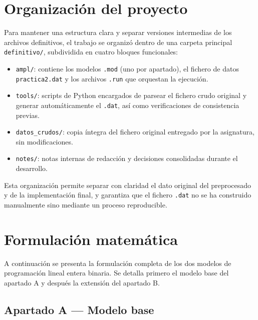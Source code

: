 \documentclass[12pt,a4paper]{article}
\begin{document}
\section{Organización del proyecto}

Para mantener una estructura clara y separar versiones intermedias de los archivos definitivos, el trabajo se organizó dentro de una carpeta principal \texttt{definitivo/}, subdividida en cuatro bloques funcionales:

\begin{itemize}
    \item \texttt{ampl/}: contiene los modelos \texttt{.mod} (uno por apartado), el fichero de datos \texttt{practica2.dat} y los archivos \texttt{.run} que orquestan la ejecución.
    \item \texttt{tools/}: scripts de Python encargados de parsear el fichero crudo original y generar automáticamente el \texttt{.dat}, así como verificaciones de consistencia previas.
    \item \texttt{datos\_crudos/}: copia íntegra del fichero original entregado por la asignatura, sin modificaciones.
    \item \texttt{notes/}: notas internas de redacción y decisiones consolidadas durante el desarrollo.
\end{itemize}

Esta organización permite separar con claridad el dato original del preprocesado y de la implementación final, y garantiza que el fichero \texttt{.dat} no se ha construido manualmente sino mediante un proceso reproducible.

\section{Formulación matemática}

A continuación se presenta la formulación completa de los dos modelos de programación lineal entera binaria. Se detalla primero el modelo base del apartado A y después la extensión del apartado B.

\subsection{Apartado A --- Modelo base}
\end{document}
